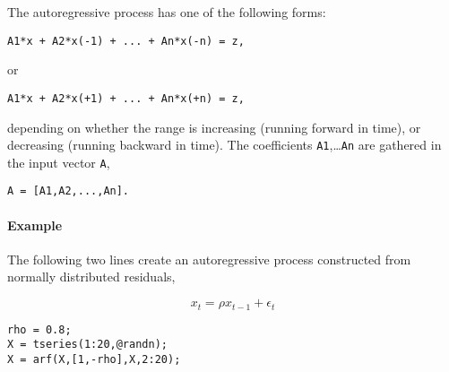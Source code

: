 The autoregressive process has one of the following forms:

\begin{verbatim}
A1*x + A2*x(-1) + ... + An*x(-n) = z,
\end{verbatim}

or

\begin{verbatim}
A1*x + A2*x(+1) + ... + An*x(+n) = z,
\end{verbatim}

depending on whether the range is increasing (running forward in time),
or decreasing (running backward in time). The coefficients
\texttt{A1},\ldots{}\texttt{An} are gathered in the input vector
\texttt{A},

\begin{verbatim}
A = [A1,A2,...,An].
\end{verbatim}

\paragraph{Example}\label{example}

The following two lines create an autoregressive process constructed
from normally distributed residuals,

\[ x_t = \rho x_{t-1} + \epsilon_t \]

\begin{verbatim}
rho = 0.8;
X = tseries(1:20,@randn);
X = arf(X,[1,-rho],X,2:20);
\end{verbatim}


